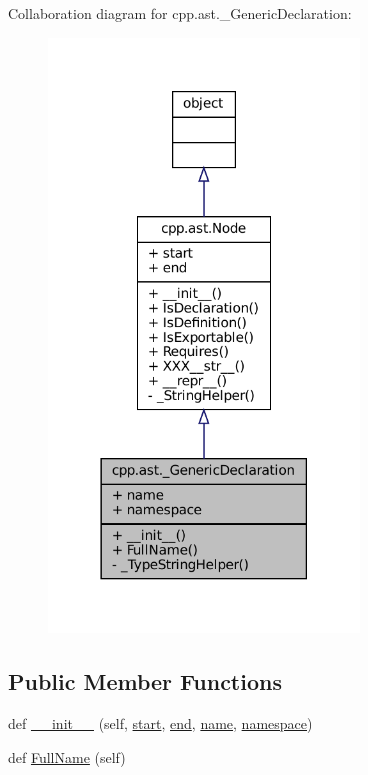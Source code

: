 Collaboration diagram for cpp.\+ast.\+\_\+\+Generic\+Declaration\+:
\nopagebreak
\begin{figure}[H]
\begin{center}
\leavevmode
\includegraphics[width=234pt]{classcpp_1_1ast_1_1__GenericDeclaration__coll__graph}
\end{center}
\end{figure}
\subsection*{Public Member Functions}
\begin{DoxyCompactItemize}
\item 
def \hyperlink{classcpp_1_1ast_1_1__GenericDeclaration_afde72751e20708a7802eb7707d23bc3c}{\+\_\+\+\_\+init\+\_\+\+\_\+} (self, \hyperlink{classcpp_1_1ast_1_1Node_a7b2aa97e6a049bb1a93aea48c48f1f44}{start}, \hyperlink{classcpp_1_1ast_1_1Node_a3c5e5246ccf619df28eca02e29d69647}{end}, \hyperlink{classcpp_1_1ast_1_1__GenericDeclaration_af774f4729dfd78d0538a6782fe8514c1}{name}, \hyperlink{classcpp_1_1ast_1_1__GenericDeclaration_a8aee3f11b37449d54b42a78e0a689f46}{namespace})
\item 
def \hyperlink{classcpp_1_1ast_1_1__GenericDeclaration_a1437d31271ea8cda62da22e2ce427a85}{Full\+Name} (self)
\end{DoxyCompactItemize}
